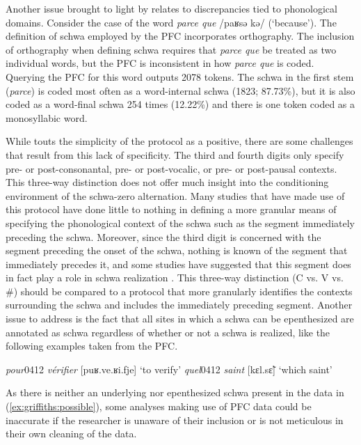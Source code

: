 \documentclass[output=paper,colorlinks,citecolor=brown,
]{langscibook}
\begin{document}
Another issue brought to light by \citet[43]{eychenne} relates to discrepancies tied to phonological domains. Consider the case of the word \textit{parce que} /paʁsə kə/ (`because'). The definition of schwa employed by the PFC incorporates orthography. The inclusion of orthography when defining schwa requires that \textit{parce que} be treated as two individual words, but the PFC is inconsistent in how \textit{parce que} is coded. Querying the PFC for this word outputs 2078 tokens. The schwa in the first stem (\textit{parce}) is coded most often as a word-internal schwa (1823; 87.73\%), but it is also coded as a word-final schwa 254 times (12.22\%) and there is one token coded as a monosyllabic word.

While \citet{lyche} touts the simplicity of the  protocol as a positive, there are some challenges that result from this lack of specificity.  The third and fourth digits only specify pre- or post-consonantal, pre- or post-vocalic, or pre- or post-pausal contexts. This three-way distinction does not offer much insight into the conditioning environment of the schwa-zero alternation. Many studies that have made use of this protocol have done little to nothing in defining a more granular means of specifying the phonological context of the schwa such as the segment immediately preceding the schwa. Moreover, since the third digit is concerned with the segment preceding the onset of the schwa, nothing is known of the segment that immediately precedes it, and some studies have suggested that this segment does in fact play a role in schwa realization \cite{malecot}. This three-way distinction (C vs. V vs. \#) should be compared to a protocol that more granularly identifies the contexts surrounding the schwa and includes the immediately preceding segment. Another issue to address is the fact that all sites in which a schwa can be epenthesized are annotated as schwa regardless of whether or not a schwa is realized, like the following examples taken from the PFC.
\begin{exe}
\ex\label{ex:griffiths:possible} \begin{xlist} 
\ex\label{ex:griffiths:pour} \textit{pour}0412 \textit{v\'erifier} [puʁ.ve.ʁi.fje] `to verify'
\ex\label{ex:griffiths:saint} \textit{quel}0412 \textit{saint} [kɛl.sɛ̃]  `which saint'
\end{xlist}
\end{exe}
As there is neither an underlying nor epenthesized schwa present in the data in (\ref{ex:griffiths:possible}), some analyses making use of PFC data could be inaccurate if the researcher is unaware of their inclusion or is not meticulous in their own cleaning of the data.
\end{document}
